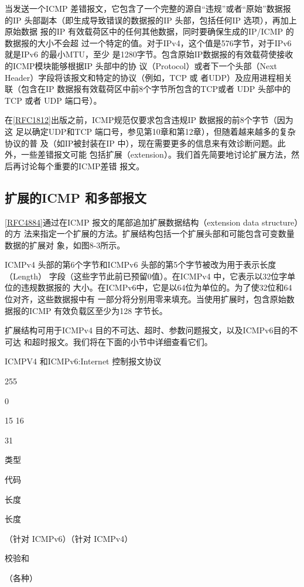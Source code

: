 当发送一个ICMP 差错报文，它包含了一个完整的源自“违规”或者“原始”数据报
的IP 头部副本（即生成导致错误的数据报的IP 头部，包括任何IP 选项），再加上原始数据
报的IP 有效载荷区中的任何其他数据，同时要确保生成的IP/ICMP 的数据报的大小不会超
过一个特定的值。对于IPv4，这个值是576字节，对于IPv6 就是IPv6 的最小MTU，至少
是1280字节。包含原始IP数据报的有效载荷使接收的ICMP模块能够根据IP 头部中的协
议（Protocol）或者下一个头部（Next Header）字段将该报文和特定的协议（例如，TCP 或
者UDP）及应用进程相关联（包含在IP 数据报有效载荷区中前8个字节所包含的TCP或者
UDP 头部中的TCP 或者 UDP 端口号）。

在\href{https://www.rfc-editor.org/rfc/rfc1812}{[RFC1812]}出版之前，ICMP规范仅要求包含违规IP 数据报的前8个字节（因为这
足以确定UDP和TCP 端口号，参见第10章和第12章），但随着越来越多的复杂协议的普
及（如IP被封装在IP 中），现在需要更多的信息来有效诊断问题。此外，一些差错报文可能
包括扩展（extension）。我们首先简要地讨论扩展方法，然后再讨论每个重要的ICMP差错
报文。

\subsection{扩展的ICMP 和多部报文}
\href{https://www.rfc-editor.org/rfc/rfc4884}{[RFC4884]}通过在ICMP 报文的尾部追加扩展数据结构（extension data structure）的方
法来指定一个扩展的方法。扩展结构包括一个扩展头部和可能包含可变数量数据的扩展对
象，如图8-3所示。

ICMPv4 头部的第6个字节和ICMPv6 头部的第5个字节被改为用于表示长度（Length）
字段（这些字节此前已预留0值）。在ICMPv4 中，它表示以32位字单位的违规数据报的
大小。在ICMPv6中，它是以64位为单位的。为了使32位和64位对齐，这些数据报中有
一部分将分别用零来填充。当使用扩展时，包含原始数据报的ICMP 有效负载区至少为128
字节长。

扩展结构可用于ICMPv4 目的不可达、超时、参数问题报文，以及ICMPv6目的不可达
和超时报文。我们将在下面的小节中详细查看它们。

ICMPV4 和ICMPv6:Internet 控制报文协议

255

0

15 16

31

类型

代码

长度

长度

（针对 ICMPv6）（针对 ICMPv4）

校验和

（各种）

